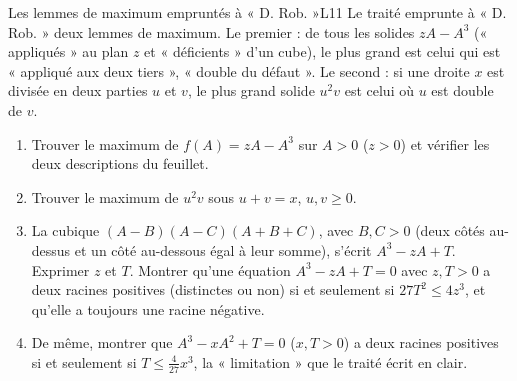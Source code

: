 \documentclass[11pt,a4paper]{article}
\begin{document}
\begin{exercice}{Les lemmes de maximum empruntés à « D. Rob. »}{L1}{1}
Le traité emprunte à « D. Rob. » deux lemmes de maximum. Le premier : de tous les
solides $zA - A^3$ (« appliqués » au plan $z$ et « déficients » d'un cube), le plus
grand est celui qui est « appliqué aux deux tiers », « double du défaut ». Le
second : si une droite $x$ est divisée en deux parties $u$ et $v$, le plus grand
solide $u^2v$ est celui où $u$ est double de $v$.
\begin{enumerate}
\item Trouver le maximum de $f(A) = zA - A^3$ sur $A > 0$ ($z > 0$) et vérifier les
  deux descriptions du feuillet.
\item Trouver le maximum de $u^2v$ sous $u + v = x$, $u, v \ge 0$.
\item La cubique $(A - B)(A - C)(A + B + C)$, avec $B, C > 0$ (deux côtés au-dessus
  et un côté au-dessous égal à leur somme), s'écrit $A^3 - zA + T$. Exprimer $z$ et
  $T$. Montrer qu'une équation $A^3 - zA + T = 0$ avec $z, T > 0$ a deux racines
  positives (distinctes ou non) si et seulement si $27T^2 \le 4z^3$, et qu'elle a
  toujours une racine négative.
\item De même, montrer que $A^3 - xA^2 + T = 0$ ($x, T > 0$) a deux racines
  positives si et seulement si $T \le \frac{4}{27}x^3$, la « limitation » que le
  traité écrit en clair.
\end{enumerate}
\end{exercice}
\end{document}
